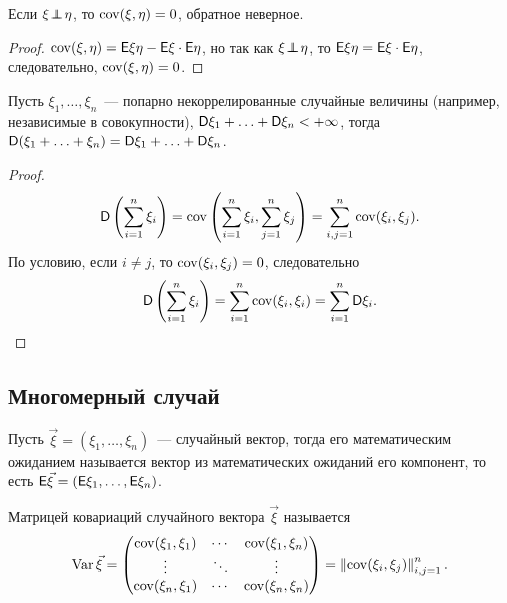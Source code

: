 \begin{property} 
	Если $\xi \!\perp\!\!\!\!\perp\! \eta$, то $\operatorname{cov} (\xi, \eta) = 0$, обратное неверное.
	\begin{proof}
			$\operatorname{cov}( \xi, \eta) = \mathsf{E} \xi \eta - \mathsf{E} \xi \cdot \mathsf{E} \eta$, но так как $\xi \!\perp\!\!\!\!\perp\! \eta$, то $\mathsf{E} \xi \eta = \mathsf{E} \xi \cdot \mathsf{E} \eta$, следовательно, $\operatorname{cov}( \xi, \eta ) = 0$.
	\end{proof}
\end{property}

\begin{lemma}
	Пусть $\xi_1, \ldots, \xi_n$~--- попарно некоррелированные случайные величины (например, независимые в совокупности), $\mathsf{D} \xi_1 + \ldots + \mathsf{D} \xi_n < +\infty$, тогда $\mathsf{D} ( \xi_1 + \ldots + \xi_n ) = \mathsf{D} \xi_1 + \ldots + \mathsf{D} \xi_n$.
	\begin{proof}
		$$\mathsf{D} \left( \sum_{i=1}^n \xi_i \right) = \operatorname{cov} \left( \sum_{i=1}^n \xi_i, \sum_{j=1}^n \xi_j \right) = \sum_{i, j = 1}^n \operatorname{cov} (\xi_i, \xi_j).$$
		По условию, если $i \neq j$, то $\operatorname{cov} (\xi_i, \xi_j) = 0$, следовательно 
		$$\mathsf{D} \left( \sum_{i=1}^n \xi_i \right) = \sum_{i=1}^n \operatorname{cov} (\xi_i, \xi_i) = \sum_{i=1}^n \mathsf{D} \xi_i.$$
	\end{proof}
\end{lemma}

\subsection{Многомерный случай}
\begin{definition}
	Пусть $\vec \xi  = (\xi_1, \ldots, \xi_n )$~--- случайный вектор, тогда его математическим ожиданием называется вектор из математических ожиданий его компонент, то есть $\mathsf{E} \vec \xi = (\mathsf{E} \xi_1, \ldots, \mathsf{E} \xi_n)$.
\end{definition}
\begin{definition}
	Матрицей ковариаций случайного вектора $\vec \xi$ называется 
	$$ \operatorname{Var} \vec \xi = \begin{pmatrix}
		\operatorname{cov} ( \xi_1, \xi_1) & \cdots & \operatorname{cov} (\xi_1, \xi_n)\\
		\vdots  & \ddots & \vdots\\
		\operatorname{cov} ( \xi_n, \xi_1) & \cdots & \operatorname{cov} (\xi_n, \xi_n)
	\end{pmatrix} = \left\| \operatorname{cov} (\xi_i, \xi_j ) \right\|_{i, j = 1}^n.$$
\end{definition}

